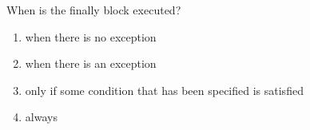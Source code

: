 \question
When is the finally block executed?

\begin{enumerate}
\item when there is no exception
\item when there is an exception
\item only if some condition that has been specified is satisfied
\item always
\end{enumerate}

